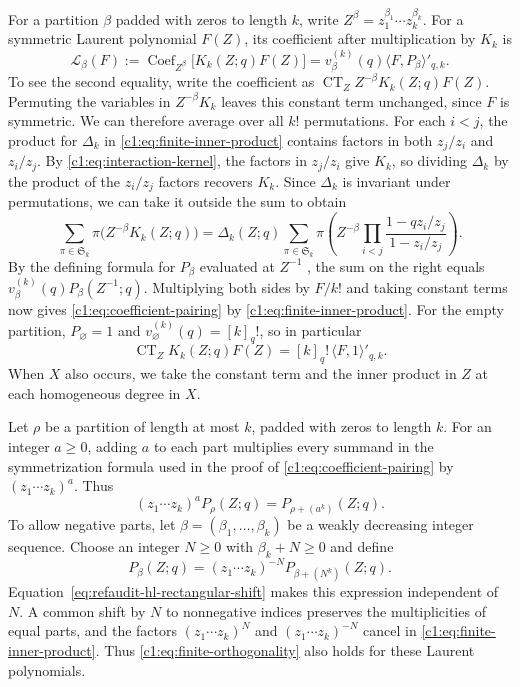 \documentclass[12pt,reqno,a4paper]{amsart}
\numberwithin{equation}{section}
\numberwithin{figure}{section}
\theoremstyle{plain}
\theoremstyle{definition}
\newcommand{\Sym}{\mathfrak S}
\DeclareMathOperator{\Coef}{Coef}
\begin{document}
For a partition $\beta$ padded with zeros to length $k$, write
$Z^\beta=z_1^{\beta_1}\cdots z_k^{\beta_k}$.  For a symmetric Laurent
polynomial $F(Z)$, its coefficient after multiplication by $K_k$ is
\begin{equation}\label{c1:eq:coefficient-pairing}
 \mathcal L_\beta(F)
 :=\Coef_{Z^\beta}\bigl[K_k(Z;q)F(Z)\bigr]
 =v_\beta^{(k)}(q)\langle F,P_\beta\rangle'_{q,k}.
\end{equation}
To see the second equality, write the coefficient as
$\operatorname{CT}_Z Z^{-\beta}K_k(Z;q)F(Z)$.  Permuting the variables
in $Z^{-\beta}K_k$ leaves this constant term unchanged, since $F$ is
symmetric.  We can therefore average over all $k!$ permutations.
For each $i<j$, the product for $\Delta_k$ in
\eqref{c1:eq:finite-inner-product} contains factors in both $z_j/z_i$
and $z_i/z_j$.  By \eqref{c1:eq:interaction-kernel}, the factors in
$z_j/z_i$ give $K_k$, so dividing $\Delta_k$ by the product of the
$z_i/z_j$ factors recovers $K_k$.
Since $\Delta_k$ is invariant under permutations, we can take it
outside the sum to obtain
\[
 \sum_{\pi\in\Sym_k}\pi\bigl(Z^{-\beta}K_k(Z;q)\bigr)
 =\Delta_k(Z;q)
   \sum_{\pi\in\Sym_k}\pi\left(
      Z^{-\beta}\prod_{i<j}\frac{1-qz_i/z_j}{1-z_i/z_j}\right).
\]
By the defining formula for $P_\beta$ evaluated at $Z^{-1}$
\cite[Chapter~III, (2.1)]{Macdonald}, the sum on the right equals
$v_\beta^{(k)}(q)P_\beta(Z^{-1};q)$.
Multiplying both sides by $F/k!$ and taking constant terms now gives
\eqref{c1:eq:coefficient-pairing} by \eqref{c1:eq:finite-inner-product}.
For the empty partition, $P_\varnothing=1$ and
$v_\varnothing^{(k)}(q)=[k]_q!$, so in particular
\begin{equation}\label{c1:eq:oriented-constant-term}
 \operatorname{CT}_Z K_k(Z;q)F(Z)
 =[k]_q!\,\langle F,1\rangle'_{q,k}.
\end{equation}
When $X$ also occurs, we take the constant term and the inner product
in $Z$ at each homogeneous degree in $X$.

Let $\rho$ be a partition of length at most $k$, padded with zeros
to length $k$.  For an integer $a\geq0$, adding $a$ to each part
multiplies every summand in the symmetrization formula used in the proof
of \eqref{c1:eq:coefficient-pairing} by $(z_1\cdots z_k)^a$.  Thus
\begin{equation}\label{eq:refaudit-hl-rectangular-shift}
 (z_1\cdots z_k)^aP_\rho(Z;q)=P_{\rho+(a^k)}(Z;q).
\end{equation}
To allow negative parts, let $\beta=(\beta_1,\ldots,\beta_k)$ be a
weakly decreasing integer sequence.  Choose an integer $N\geq0$ with
$\beta_k+N\geq0$ and define
\[
 P_\beta(Z;q)
 =(z_1\cdots z_k)^{-N}
   P_{\beta+(N^k)}(Z;q).
\]
Equation~\eqref{eq:refaudit-hl-rectangular-shift} makes this expression
independent of $N$.  A common shift by $N$ to nonnegative indices preserves
the multiplicities of equal parts, and the factors $(z_1\cdots z_k)^N$ and
$(z_1\cdots z_k)^{-N}$ cancel in \eqref{c1:eq:finite-inner-product}.
Thus \eqref{c1:eq:finite-orthogonality} also holds for these Laurent polynomials.
\end{document}
